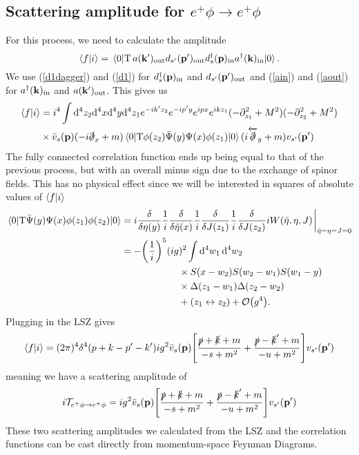 \subsection{Scattering amplitude for $e^+\phi\to e^+\phi$}
For this process, we need to calculate the amplitude
\begin{equation}
    \braket{f}{i}=\vev{\text{T}\,a(\vb{k}^\prime)_{\text{out}}d_{s^\prime}(\vb{p}^\prime)_{\text{out}}d^\dagger_{s}(\vb{p})_{\text{in}}a^\dagger(\vb{k})_{\text{in}}}.
\end{equation}
We use (\ref{d1dagger}) and (\ref{d1}) for $d^\dagger_s(\vb{p})_{\text{in}}$ and $d_{s^\prime}(\vb{p}^\prime)_{\text{out}}$ and (\ref{ain}) and (\ref{aout}) for $a^\dagger(\vb{k})_{\text{in}}$ and $a(\vb{k}^\prime)_{\text{out}}$. This gives us
\begin{equation}
\begin{aligned}
\braket{f}{i}&=i^4\int\dd^4z_2\dd^4x\dd^4y\dd^4z_1e^{-ik^\prime z_2}e^{-ip^\prime y}e^{ipx}e^{ikz_1}(-\partial^2_{z_1}+M^2)(-\partial^2_{z_2}+M^2)\\&\times \bar{v}_{s}(\vb{p})(-i\slashed{\partial}_x+m)\vev{\text{T}\phi(z_2)\bar{\Psi}(y)\Psi(x)\phi(z_1)}(i\overleftarrow{\slashed{\partial}}_y+m)v_{s^\prime}(\vb{p}^\prime)
\end{aligned}
\end{equation}
The fully connected correlation function ends up being equal to that of the previous process, but with an overall minus sign due to the exchange of spinor fields. This has no physical effect since we will be interested in squares of absolute values of $\braket{f}{i}$
\begin{equation}
\begin{aligned}
\vev{\text{T}\bar{\Psi}(y)\Psi(x)\phi(z_1)\phi(z_2)}&=i\fdv{\eta(y)}\frac{1}{i}\fdv{\bar{\eta}(x)}\frac{1}{i}\fdv{J(z_1)}\frac{1}{i}\fdv{J(z_2)}iW(\bar{\eta},\eta,J)\eval_{\bar{\eta}=\eta=J=0}\\
&=-\qty(\frac{1}{i})^5(ig)^2\int\dd^4w_1\,\dd^4w_2\,\\
&\qquad\qquad\qquad\times S(x-w_2)S(w_2-w_1)S(w_1-y)\\&\qquad\qquad\qquad\times\Delta(z_1-w_1)\Delta(z_2-w_2)\\&\qquad\qquad\qquad+(z_1 \leftrightarrow z_2)+\order{g^4}.
\end{aligned}
\end{equation}
Plugging in the LSZ gives
\begin{equation}
    \braket{f}{i}=(2\pi)^4\delta^4(p+k-p^\prime-k^\prime)ig^2\bar{v}_s(\vb{p})\qty[\frac{\slashed{p}+\slashed{k}+m}{-s+m^2}+\frac{\slashed{p}-\slashed{k}^\prime+m}{-u+m^2}]v_{s^\prime}(\vb{p}^\prime)
\end{equation}
meaning we have a scattering amplitude of
\begin{equation}
    i\mathcal{T}_{e^+\phi\to e^+\phi}=ig^2\bar{v}_s(\vb{p})\qty[\frac{\slashed{p}+\slashed{k}+m}{-s+m^2}+\frac{\slashed{p}-\slashed{k}^\prime+m}{-u+m^2}]v_{s^\prime}(\vb{p}^\prime)
    \label{positron_scalar}
\end{equation}
These two scattering amplitudes we calculated  from the LSZ and the correlation functions can be cast directly from momentum-space Feynman Diagrams.
